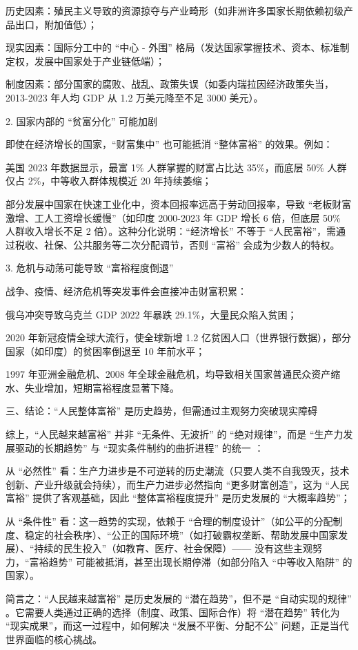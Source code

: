 \documentclass[12pt,oneside]{book}
\begin{document}
历史因素：殖民主义导致的资源掠夺与产业畸形（如非洲许多国家长期依赖初级产品出口，附加值低）；

现实因素：国际分工中的 “中心 - 外围” 格局（发达国家掌握技术、资本、标准制定权，发展中国家处于产业链低端）；

制度因素：部分国家的腐败、战乱、政策失误（如委内瑞拉因经济政策失当，2013-2023 年人均 GDP 从 1.2 万美元降至不足 3000 美元）。

2.  国家内部的 “贫富分化” 可能加剧

即使在经济增长的国家，“财富集中” 也可能抵消 “整体富裕” 的效果。例如：

美国 2023 年数据显示，最富 1\% 人群掌握的财富占比达 35\%，而底层 50\% 人群仅占 2\%，中等收入群体规模近 20 年持续萎缩；

部分发展中国家在快速工业化中，资本回报率远高于劳动回报率，导致 “老板财富激增、工人工资增长缓慢”（如印度 2000-2023 年 GDP 增长 6 倍，但底层 50\% 人群收入增长不足 2 倍）。这种分化说明：“经济增长” 不等于 “人民富裕”，需通过税收、社保、公共服务等二次分配调节，否则 “富裕” 会成为少数人的特权。

3.  危机与动荡可能导致 “富裕程度倒退”

战争、疫情、经济危机等突发事件会直接冲击财富积累：

俄乌冲突导致乌克兰 GDP 2022 年暴跌 29.1\%，大量民众陷入贫困；

2020 年新冠疫情全球大流行，使全球新增 1.2 亿贫困人口（世界银行数据），部分国家（如印度）的贫困率倒退至 10 年前水平；

1997 年亚洲金融危机、2008 年全球金融危机，均导致相关国家普通民众资产缩水、失业增加，短期富裕程度显著下降。

三、结论：“人民整体富裕” 是历史趋势，但需通过主观努力突破现实障碍

综上，“人民越来越富裕” 并非 “无条件、无波折” 的 “绝对规律”，而是 “生产力发展驱动的长期趋势” 与 “现实条件制约的曲折进程” 的统一 ：

从 “必然性” 看：生产力进步是不可逆转的历史潮流（只要人类不自我毁灭，技术创新、产业升级就会持续），而生产力进步必然指向 “更多财富创造”，这为 “人民富裕” 提供了客观基础，因此 “整体富裕程度提升” 是历史发展的 “大概率趋势”；

从 “条件性” 看：这一趋势的实现，依赖于 “合理的制度设计”（如公平的分配制度、稳定的社会秩序）、“公正的国际环境”（如打破霸权垄断、帮助发展中国家发展）、“持续的民生投入”（如教育、医疗、社会保障）—— 没有这些主观努力，“富裕趋势” 可能被抵消，甚至出现长期停滞（如部分陷入 “中等收入陷阱” 的国家）。

简言之：“人民越来越富裕” 是历史发展的 “潜在趋势”，但不是 “自动实现的规律” 。它需要人类通过正确的选择（制度、政策、国际合作）将 “潜在趋势” 转化为 “现实成果”，而这一过程中，如何解决 “发展不平衡、分配不公” 问题，正是当代世界面临的核心挑战。
\end{document}
